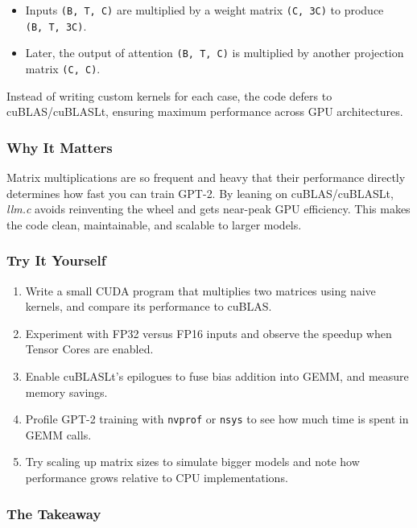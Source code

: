 \documentclass[
  letterpaper,
  DIV=11,
  numbers=noendperiod]{scrreprt}
\providecommand{\tightlist}{%
  \setlength{\itemsep}{0pt}\setlength{\parskip}{0pt}}
\begin{document}
\begin{itemize}
\tightlist
\item
  Inputs \texttt{(B,\ T,\ C)} are multiplied by a weight matrix
  \texttt{(C,\ 3C)} to produce \texttt{(B,\ T,\ 3C)}.
\item
  Later, the output of attention \texttt{(B,\ T,\ C)} is multiplied by
  another projection matrix \texttt{(C,\ C)}.
\end{itemize}

Instead of writing custom kernels for each case, the code defers to
cuBLAS/cuBLASLt, ensuring maximum performance across GPU architectures.

\subsubsection{Why It Matters}\label{why-it-matters-38}

Matrix multiplications are so frequent and heavy that their performance
directly determines how fast you can train GPT-2. By leaning on
cuBLAS/cuBLASLt, \emph{llm.c} avoids reinventing the wheel and gets
near-peak GPU efficiency. This makes the code clean, maintainable, and
scalable to larger models.

\subsubsection{Try It Yourself}\label{try-it-yourself-50}

\begin{enumerate}
\def\labelenumi{\arabic{enumi}.}
\tightlist
\item
  Write a small CUDA program that multiplies two matrices using naive
  kernels, and compare its performance to cuBLAS.
\item
  Experiment with FP32 versus FP16 inputs and observe the speedup when
  Tensor Cores are enabled.
\item
  Enable cuBLASLt's epilogues to fuse bias addition into GEMM, and
  measure memory savings.
\item
  Profile GPT-2 training with \texttt{nvprof} or \texttt{nsys} to see
  how much time is spent in GEMM calls.
\item
  Try scaling up matrix sizes to simulate bigger models and note how
  performance grows relative to CPU implementations.
\end{enumerate}

\subsubsection{The Takeaway}\label{the-takeaway-51}
\end{document}

